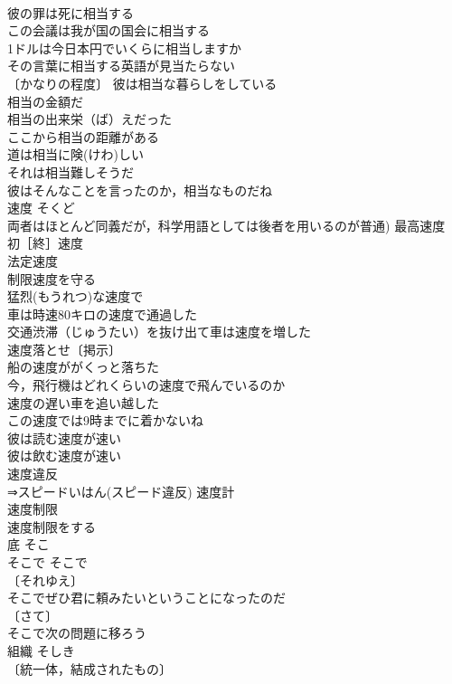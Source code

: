\documentclass[8pt]{extreport}
\begin{document}
\begin{CJK}{UTF8}{min}
\\	彼の罪は死に相当する 
\\	この会議は我が国の国会に相当する 
\\	1ドルは今日本円でいくらに相当しますか 
\\	その言葉に相当する英語が見当たらない 
\\	〔かなりの程度〕 彼は相当な暮らしをしている 
\\	相当の金額だ 
\\	相当の出来栄（ば）えだった 
\\	ここから相当の距離がある 
\\	道は相当に険(けわ)しい 
\\	それは相当難しそうだ 
\\	彼はそんなことを言ったのか，相当なものだね 
\\	速度	そくど	
\\	両者はほとんど同義だが，科学用語としては後者を用いるのが普通) 最高速度 
\\	初［終］速度 
\\	法定速度 
\\	制限速度を守る 
\\	猛烈(もうれつ)な速度で 
\\	車は時速80キロの速度で通過した 
\\	交通渋滞（じゅうたい）を抜け出て車は速度を増した 
\\	速度落とせ〔掲示〕 
\\	船の速度ががくっと落ちた 
\\	今，飛行機はどれくらいの速度で飛んでいるのか 
\\	速度の遅い車を追い越した 
\\	この速度では9時までに着かないね 
\\	彼は読む速度が速い 
\\	彼は飲む速度が速い 
\\	速度違反 
\\	⇒スピードいはん(スピード違反) 速度計 
\\	速度制限 
\\	速度制限をする 
\\	底	そこ	
\\	そこで	そこで	
\\	〔それゆえ〕
\\	そこでぜひ君に頼みたいということになったのだ 
\\	〔さて〕
\\	そこで次の問題に移ろう 
\\	組織	そしき	
\\	〔統一体，結成されたもの〕

\end{CJK}
\end{document}
